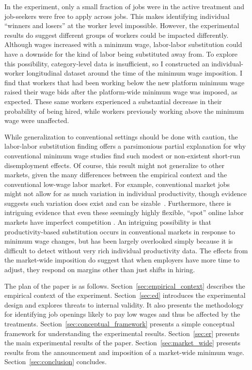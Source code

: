 \documentclass[AER]{AEA}
\begin{document}
In the experiment, only a small fraction of jobs were in the active treatment and job-seekers were free to apply across jobs.
This makes identifying individual ``winners and losers'' at the worker level impossible.
However, the experimental results do suggest different groups of workers could be impacted differently.
Although wages increased with a minimum wage, labor-labor substitution could have a downside for the kind of labor being substituted away from.
To explore this possibility, category-level data is insufficient, so I constructed an individual-worker longitudinal dataset around the time of the minimum wage imposition.
I find that workers that had been working below the new platform minimum wage raised their wage bids after the platform-wide minimum wage was imposed, as expected. 
These same workers experienced a substantial decrease in their probability of being hired, while workers previously working above the minimum wage were unaffected.

While generalization to conventional settings should be done with caution, the labor-labor substitution finding offers a parsimonious partial explanation for why conventional minimum wage studies find such modest or non-existent short-run disemployment effects. 
Of course, this result might not generalize to other markets, given the many differences between the empirical context and the conventional low-wage labor market.
For example, conventional market jobs might not allow for as much variation in individual productivity, though evidence suggests such variation does exist and can be sizable~\citep{lazear2015value, sandvik2020workplace}.
Furthermore, there is intriguing evidence that even these seemingly highly flexible, ``spot'' online labor markets have imperfect competition \cite{dube2020monopsony}.
An intriguing possibility is that productivity-based substitution occurs in conventional markets in response to minimum wage changes, but has been largely overlooked simply because it is difficult to detect without very rich individual productivity data. 
The effects from the market-wide imposition do suggest that when employers have more time to adjust, they respond on margins other than just shifts in hiring.

The plan of the paper is as follows. 
Section~\ref{sec:empirical_context} describes the empirical context of the experiment. 
Section~\ref{sec:ed} introduces the experimental design and explores threats to internal validity.
It also presents the methodology for identifying job openings likely to pay low wages and thus be affected by the treatments.
Section~\ref{sec:conceptual_framework} presents a simple conceptual framework for understanding the experimental results.
Section~\ref{sec:er} presents the main experimental results of the paper.
Section~\ref{sec:market_wide} presents results from the announcement and imposition of a market-wide minimum wage.
Section~\ref{sec:conclusion} concludes. 
\end{document}
